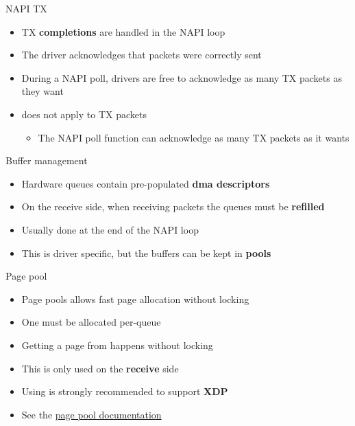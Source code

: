 \begin{frame}{NAPI TX}
	\begin{itemize}
		\item TX \textbf{completions} are handled in the NAPI loop
		\item The driver acknowledges that packets were correctly sent
		\item During a NAPI poll, drivers are free to acknowledge as many TX packets as they want
		\item {} does not apply to TX packets
			\begin{itemize}
				\item The NAPI poll function can acknowledge as many TX packets as it wants
			\end{itemize}
	\end{itemize}
\end{frame}

\begin{frame}{Buffer management}
	\begin{itemize}
		\item Hardware queues contain pre-populated \textbf{dma descriptors}
		\item On the receive side, when receiving packets the queues must be \textbf{refilled}
		\item Usually done at the end of the NAPI loop
		\item This is driver specific, but the buffers can be kept in \textbf{pools}
	\end{itemize}
\end{frame}

\begin{frame}{Page pool}
	\begin{itemize}
		\item Page pools allows fast page allocation without locking
		\item One  must be allocated per-queue
		\item Getting a page from  happens without locking
		\item This is only used on the \textbf{receive} side
		\item Using  is strongly recommended to support \textbf{XDP}
		\item See the \href{https://docs.kernel.org/networking/page_pool.html}{page pool documentation}
	\end{itemize}
\end{frame}

